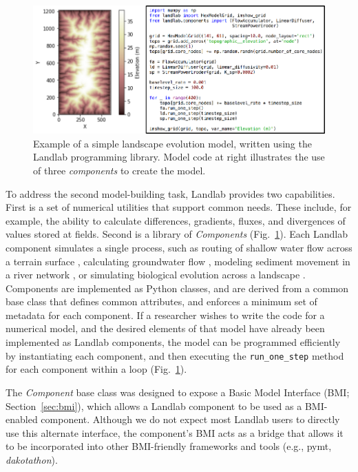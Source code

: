 \documentclass[journal abbreviation, manuscript]{copernicus}
\begin{document}
\begin{figure}[h!]
\centering
\includegraphics{Figures/fig11.pdf}
\caption{Example of a simple landscape evolution model, written using the Landlab programming library. Model code at right illustrates the use of three \textit{components} to create the model.}
\label{fig:landlablem}
\end{figure}

To address the second model-building task, Landlab provides two capabilities. First is a set of numerical utilities that support common needs. These include, for example, the ability to calculate differences, gradients, fluxes, and divergences of values stored at fields. Second is a library of \textit{Components} (Fig.~\ref{fig:landlablem}). Each Landlab component simulates a single process, such as routing of shallow water flow across a terrain surface \citep{adams2017landlab}, calculating groundwater flow \citep{litwin2020groundwaterdupuitpercolator}, modeling sediment movement in a river network \citep{pfeiffer2020networksedimenttransporter}, or simulating biological evolution across a landscape \citep{lyons2020speciesevolver}. Components are implemented as Python classes, and are derived from a common base class that defines common attributes, and enforces a minimum set of metadata for each component. If a researcher wishes to write the code for a numerical model, and the desired elements of that model have already been implemented as Landlab components, the model can be programmed efficiently by instantiating each component, and then executing the \texttt{run\_one\_step} method for each component within a loop (Fig.~\ref{fig:landlablem}).

The \textit{Component} base class was designed to expose a Basic Model Interface (BMI; Section~\ref{sec:bmi}), which allows a Landlab component to be used as a BMI-enabled component.
Although we do not expect most Landlab users to directly use this alternate interface, the
component's BMI acts as a bridge that allows it to be incorporated into other BMI-friendly
frameworks and tools (e.g., pymt, \textit{dakotathon}).
\end{document}
